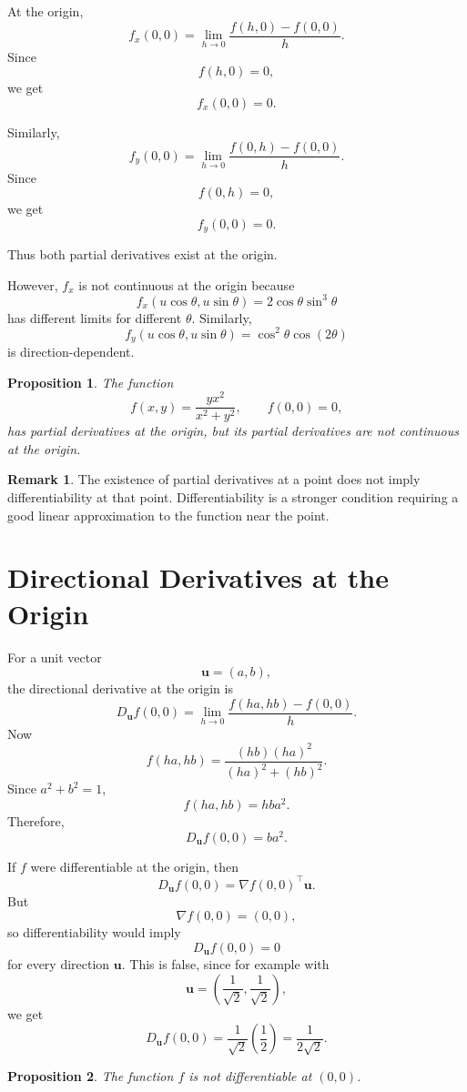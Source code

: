 \documentclass[12pt,oneside]{book}
\numberwithin{equation}{section}
\theoremstyle{definition}
\newtheorem{remark}{Remark}[section]
\theoremstyle{plain}
\newtheorem{proposition}{Proposition}[section]
\theoremstyle{remark}
\newcommand{\grad}{\nabla}
\begin{document}
At the origin,
\[
f_x(0,0)
=
\lim_{h\to 0}\frac{f(h,0)-f(0,0)}{h}.
\]
Since
\[
f(h,0)=0,
\]
we get
\[
f_x(0,0)=0.
\]

Similarly,
\[
f_y(0,0)
=
\lim_{h\to 0}\frac{f(0,h)-f(0,0)}{h}.
\]
Since
\[
f(0,h)=0,
\]
we get
\[
f_y(0,0)=0.
\]

Thus both partial derivatives exist at the origin.

However, $f_x$ is not continuous at the origin because
\[
f_x(u\cos\theta,u\sin\theta)
=
2\cos\theta\sin^3\theta
\]
has different limits for different $\theta$. Similarly,
\[
f_y(u\cos\theta,u\sin\theta)
=
\cos^2\theta\cos(2\theta)
\]
is direction-dependent.

\begin{proposition}
The function
\[
f(x,y)=\frac{yx^2}{x^2+y^2},
\qquad
f(0,0)=0,
\]
has partial derivatives at the origin, but its partial derivatives are not continuous at the origin.
\end{proposition}

\begin{remark}
The existence of partial derivatives at a point does not imply differentiability at that point. Differentiability is a stronger condition requiring a good linear approximation to the function near the point.
\end{remark}

\section{Directional Derivatives at the Origin}

For a unit vector
\[
\mathbf{u}=(a,b),
\]
the directional derivative at the origin is
\[
D_{\mathbf{u}}f(0,0)
=
\lim_{h\to 0}
\frac{f(ha,hb)-f(0,0)}{h}.
\]
Now
\[
f(ha,hb)
=
\frac{(hb)(ha)^2}{(ha)^2+(hb)^2}.
\]
Since $a^2+b^2=1$,
\[
f(ha,hb)=hba^2.
\]
Therefore,
\[
D_{\mathbf{u}}f(0,0)=ba^2.
\]

If $f$ were differentiable at the origin, then
\[
D_{\mathbf{u}}f(0,0)
=
\grad f(0,0)^\top \mathbf{u}.
\]
But
\[
\grad f(0,0)=(0,0),
\]
so differentiability would imply
\[
D_{\mathbf{u}}f(0,0)=0
\]
for every direction $\mathbf{u}$. This is false, since for example with
\[
\mathbf{u}=\left(\frac{1}{\sqrt{2}},\frac{1}{\sqrt{2}}\right),
\]
we get
\[
D_{\mathbf{u}}f(0,0)
=
\frac{1}{\sqrt{2}}\left(\frac{1}{2}\right)
=
\frac{1}{2\sqrt{2}}.
\]

\begin{proposition}
The function $f$ is not differentiable at $(0,0)$.
\end{proposition}
\end{document}
